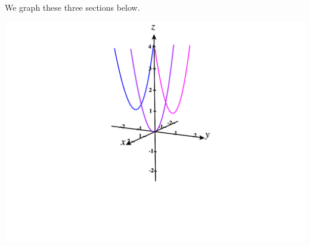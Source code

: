 \documentclass{ximera}
\begin{document}
\begin{example}
We graph these three sections below.

\begin{image}
\includegraphics[width = \textwidth]{CalcPlot3D-y_sections}
\end{image}

\end{example}
\end{document}
